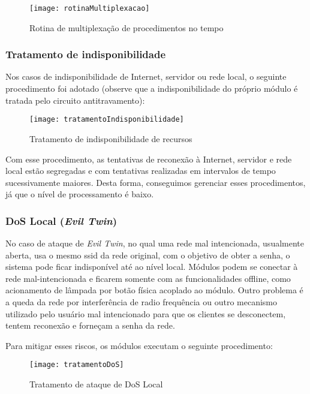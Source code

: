 \begin{figure}[H]
	\centering
	\caption{Rotina de multiplexação de procedimentos no tempo}
  \texttt{[image: rotinaMultiplexacao]}
\label{fig:rotinaMultiplexacao}
\end{figure}

\subsubsection{Tratamento de indisponibilidade}
Nos casos de indisponibilidade de Internet, servidor ou rede local, o seguinte procedimento foi adotado (observe que a indisponibilidade do próprio módulo é tratada pelo circuito antitravamento):

\begin{figure}[H]
	\centering
	\caption{Tratamento de indisponibilidade de recursos}
  \texttt{[image: tratamentoIndisponibilidade]}
\label{fig:tratamentoIndisponibilidade}
\end{figure}

Com esse procedimento, as tentativas de reconexão à Internet, servidor e rede local estão segregadas e com tentativas realizadas em intervalos de tempo sucessivamente maiores. Desta forma, conseguimos gerenciar esses procedimentos, já que o nível de processamento é baixo.

\subsubsection{DoS Local (\textit{Evil Twin})}
No caso de ataque de \textit{Evil Twin}, no qual uma rede mal intencionada, usualmente aberta, usa o mesmo ssid da rede original, com o objetivo de obter a senha, o sistema pode ficar indisponível até ao nível local. Módulos podem se conectar à rede mal-intencionada e ficarem somente com as funcionalidades offline, como acionamento de lâmpada por botão física acoplado ao módulo. Outro problema é a queda da rede por interferência de radio frequência ou outro mecanismo utilizado pelo usuário mal intencionado para que os clientes se desconectem, tentem reconexão e forneçam a senha da rede.

Para mitigar esses riscos, os módulos executam o seguinte procedimento:
\begin{figure}[H]
	\centering
	\caption{Tratamento de ataque de DoS Local}
  \texttt{[image: tratamentoDoS]}
\label{fig:tratamentoDoS}
\end{figure}

